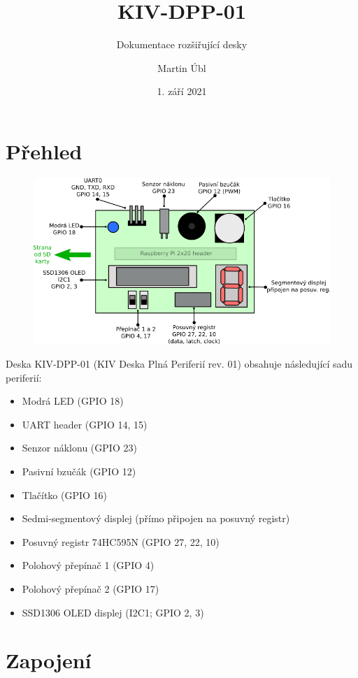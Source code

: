 \documentclass{article}
\title{KIV-DPP-01}
\subtitle{Dokumentace rozšiřující desky}
\author{Martin Úbl}
\date{1. září 2021}
\makeatletter
\def\maketitle{\begin{titlepage}%
		\let\footnotesize\small
		\let\footnoterule\relax
		\let \footnote \thanks
		\null\vfil
		\vskip 60\p@
		\begin{center}%
			{\LARGE \@title \par}%
			\vskip 1.5em%
			{\Large \@subtitle \par}%
			\vskip 3em%
			{\large
				\lineskip .75em%
				\begin{tabular}[t]{c}%
					\@author
				\end{tabular}\par}%
			\vskip 1.5em%
			{\large \@date \par}%
		\end{center}\par
		\@thanks
		\vfil\null
	\end{titlepage}%
	\setcounter{footnote}{0}%
	\global\let\thanks\relax
	\global\let\maketitle\relax
	\global\let\@thanks\@empty
	\global\let\@author\@empty
	\global\let\@date\@empty
	\global\let\@title\@empty
	\global\let\title\relax
	\global\let\author\relax
	\global\let\date\relax
	\global\let\and\relax
}
\makeatother
\begin{document}
\maketitle



\section{Přehled}

\begin{figure}[ht]
	\centering
	\includegraphics[width=1.0\linewidth]{kiv-dpp-01.png}
\end{figure}

Deska KIV-DPP-01 (KIV Deska Plná Periferií rev. 01) obsahuje následující sadu periferií:
\begin{itemize}
	\item Modrá LED (GPIO 18)
	\item UART header (GPIO 14, 15)
	\item Senzor náklonu (GPIO 23)
	\item Pasivní bzučák (GPIO 12)
	\item Tlačítko (GPIO 16)
	\item Sedmi-segmentový displej (přímo připojen na posuvný registr)
	\item Posuvný registr 74HC595N (GPIO 27, 22, 10)
	\item Polohový přepínač 1 (GPIO 4)
	\item Polohový přepínač 2 (GPIO 17)
	\item SSD1306 OLED displej (I2C1; GPIO 2, 3)
\end{itemize}

\newpage

\section{Zapojení}
\end{document}

